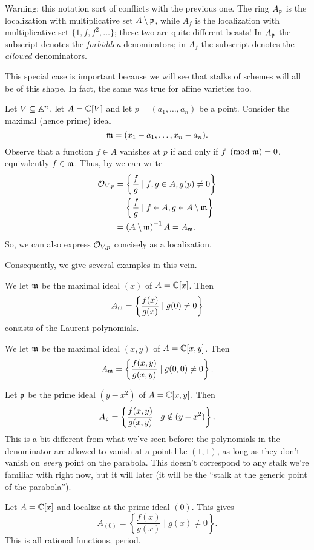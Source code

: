 Warning: this notation sort of conflicts with the previous one.
The ring $A_\mathfrak p$ is the localization with multiplicative set $A \setminus \mathfrak p$,
while $A_f$ is the localization with multiplicative set $\{1,f,f^2,\dots\}$;
these two are quite different beasts!
In $A_\mathfrak p$ the subscript denotes the \emph{forbidden} denominators;
in $A_f$ the subscript denotes the \emph{allowed} denominators.

This special case is important because we will see that
stalks of schemes will all be of this shape.
In fact, the same was true for affine varieties too.
\begin{example}
	Let $V \subseteq \mathbb A^n$, let $A = \mathbb C[V]$
	and let $p = (a_1, \dots, a_n)$ be a point.
	Consider the maximal (hence prime) ideal
	\[ \mathfrak m = (x_1 - a_1, \dots, x_n - a_n). \]
	Observe that a function $f \in A$ vanishes at $p$
	if and only if $f \pmod{\mathfrak m} = 0$, equivalently $f \in \mathfrak m$.
	Thus, by  we can write
	\begin{align*}
		\mathcal O_{V,p} &= \left\{ \frac{f}{g} \mid f,g \in A, g(p) \ne 0 \right\} \\
		&= \left\{ \frac{f}{g} \mid f \in A, g \in A \setminus \mathfrak m \right\} \\
		&= \left( A \setminus \mathfrak m \right)^{-1} A = A_\mathfrak m.
	\end{align*}
	So, we can also express $\mathcal O_{V,p}$ concisely as a localization.
\end{example}
Consequently, we give several examples in this vein.

\begin{example}
	\listhack
	\begin{enumerate}[(a)]
		\ii We let $\mathfrak m$ be the maximal ideal $(x)$ of $A = \mathbb C[x]$.
		Then \[ A_\mathfrak m = \left\{ \frac{f(x)}{g(x)} \mid g(0) \ne 0 \right\} \]
		consists of the Laurent polynomials.

		\ii We let $\mathfrak m$ be the maximal ideal $(x,y)$ of $A = \mathbb C[x,y]$.
		Then \[ A_\mathfrak m = \left\{ \frac{f(x,y)}{g(x,y)} \mid g(0,0) \ne 0 \right\}. \]

		\ii Let $\mathfrak p$ be the prime ideal $(y-x^2)$ of $A = \mathbb C[x,y]$.
		Then
		\[ A_\mathfrak p = \left\{ \frac{f(x,y)}{g(x,y)} \mid g \notin (y-x^2) \right\}. \]
		This is a bit different from what we've seen before:
		the polynomials in the denominator are allowed to vanish
		at a point like $(1,1)$, as long as they don't vanish on
		\emph{every} point on the parabola.
		This doesn't correspond to any stalk we're familiar with right now,
		but it will later
		(it will be the ``stalk at the generic point of the parabola'').

		\ii Let $A = \mathbb C[x]$ and localize at the prime ideal $(0)$.
		This gives \[ A_{(0)} = \left\{ \frac{f(x)}{g(x)} \mid g(x) \ne 0 \right\}. \]
		This is all rational functions, period.
	\end{enumerate}
\end{example}

